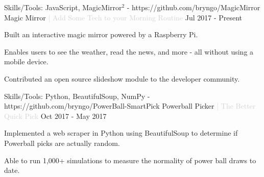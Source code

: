 

\begin{cventries}

  \cventry
  {Skills/Tools: JavaScript, MagicMirror$^2$ - https://github.com/bryngo/MagicMirror} %
  {Magic Mirror \textcolor{lightgray}{| Add Some Tech to your Morning Routine}} %
  {} %
  {Jul 2017 - Present} %
  {
  \begin{cvitems} %
    \item {Built an interactive magic mirror powered by a Raspberry Pi.}
    \item {Enables users to see the weather, read the news, and more - all without using a mobile device.}
    \item {Contributed an open source slideshow module to the developer community.}
  \end{cvitems}
  }
  \cventry
  {Skills/Tools: Python, BeautifulSoup, NumPy - https://github.com/bryngo/PowerBall-SmartPick} %
  {Powerball Picker \textcolor{lightgray}{| The Better Quick Pick}} %
  {} %
  {Oct 2017 - May 2017} %
  {
  \begin{cvitems} %
    \item {Implemented a web scraper in Python using BeautifulSoup to determine if Powerball picks are actually random.}
    \item {Able to run 1,000+ simulations to measure the normality of power ball draws to date.}
  \end{cvitems}
  }


\end{cventries}

